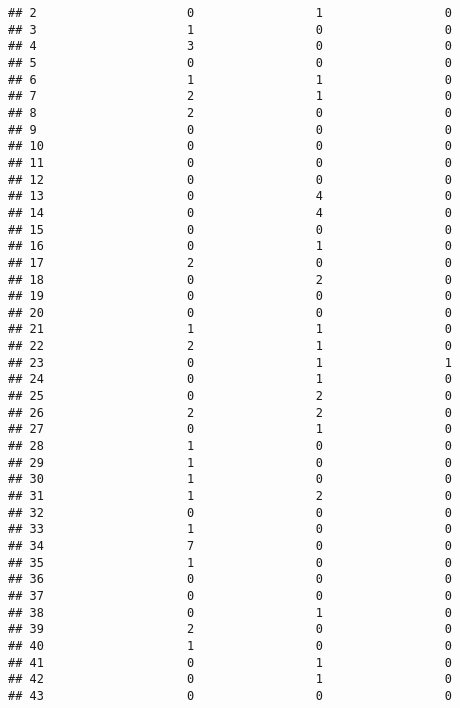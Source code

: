 \documentclass[
]{article}
\begin{document}
\begin{verbatim}
## 2                     0                 1                 0
## 3                     1                 0                 0
## 4                     3                 0                 0
## 5                     0                 0                 0
## 6                     1                 1                 0
## 7                     2                 1                 0
## 8                     2                 0                 0
## 9                     0                 0                 0
## 10                    0                 0                 0
## 11                    0                 0                 0
## 12                    0                 0                 0
## 13                    0                 4                 0
## 14                    0                 4                 0
## 15                    0                 0                 0
## 16                    0                 1                 0
## 17                    2                 0                 0
## 18                    0                 2                 0
## 19                    0                 0                 0
## 20                    0                 0                 0
## 21                    1                 1                 0
## 22                    2                 1                 0
## 23                    0                 1                 1
## 24                    0                 1                 0
## 25                    0                 2                 0
## 26                    2                 2                 0
## 27                    0                 1                 0
## 28                    1                 0                 0
## 29                    1                 0                 0
## 30                    1                 0                 0
## 31                    1                 2                 0
## 32                    0                 0                 0
## 33                    1                 0                 0
## 34                    7                 0                 0
## 35                    1                 0                 0
## 36                    0                 0                 0
## 37                    0                 0                 0
## 38                    0                 1                 0
## 39                    2                 0                 0
## 40                    1                 0                 0
## 41                    0                 1                 0
## 42                    0                 1                 0
## 43                    0                 0                 0

\end{verbatim}
\end{document}
